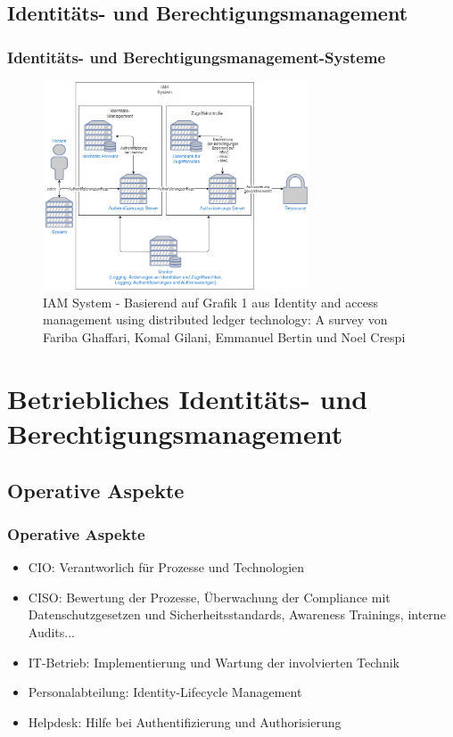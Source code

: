 \documentclass[11pt]{beamer}
\begin{document}
\subsection{Identitäts- und Berechtigungsmanagement}

\begin{frame}
  \frametitle{Identitäts- und Berechtigungsmanagement-Systeme}
  \begin{figure}[H]
    \centering
    \includegraphics[width=0.7\textwidth]{assets/accessmanagement2.png}
    \caption{IAM System - Basierend auf Grafik 1 aus \glqq{}Identity and access management using distributed ledger technology: A survey\grqq{} von Fariba Ghaffari, Komal Gilani, Emmanuel Bertin und Noel Crespi}\label{figure:iam}
  \end{figure}
\end{frame}

\section{Betriebliches Identitäts- und Berechtigungsmanagement}

\subsection{Operative Aspekte}
\begin{frame}
  \frametitle{Operative Aspekte}
  \begin{itemize}
    \item CIO: Verantworlich für Prozesse und Technologien
    \item CISO: Bewertung der Prozesse, Überwachung der Compliance mit Datenschutzgesetzen und Sicherheitsstandards, Awareness Trainings, interne Audits...~
    \item IT-Betrieb: Implementierung und Wartung der involvierten Technik~
    \item Personalabteilung: Identity-Lifecycle Management~
    \item Helpdesk: Hilfe bei Authentifizierung und Authorisierung~
  \end{itemize}
\end{frame}
\end{document}
